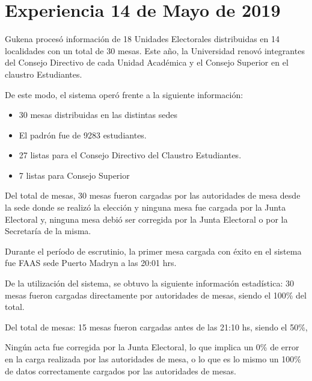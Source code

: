 \section{Experiencia 14 de Mayo de 2019}
Gukena procesó información de 18 Unidades Electorales distribuidas en 14 localidades con un total de 30 mesas. Este año, la Universidad renovó integrantes del Consejo Directivo de cada Unidad Académica y el Consejo Superior en el claustro Estudiantes.

De este modo, el sistema operó frente a la siguiente información:
\begin{itemize}
    \item 30 mesas distribuidas en las distintas sedes
     \item El padrón fue de  9283 estudiantes.
     \item 27 listas para el Consejo Directivo del Claustro Estudiantes.
     \item 7 listas para Consejo Superior
\end{itemize}
Del total de mesas, 30 mesas fueron cargadas por las autoridades de mesa desde la sede donde se realizó la elección y ninguna mesa fue cargada por la Junta Electoral y, ninguna mesa debió ser corregida por la Junta Electoral o por la Secretaría de la misma.

Durante el período de escrutinio, la primer mesa cargada con éxito en el sistema fue FAAS sede Puerto Madryn a las 20:01 hrs.

De la utilización del sistema, se obtuvo la siguiente información estadística:
30 mesas fueron cargadas directamente por autoridades de mesas, siendo el 100\% del total.

Del total de mesas:
15 mesas fueron cargadas antes de las 21:10 hs, siendo el 50\%,

Ningún acta fue corregida por la Junta Electoral, lo que implica un 0\% de error en la carga realizada por las autoridades de mesa, o lo que es lo mismo un 100\% de datos correctamente cargados por las autoridades de mesas.

